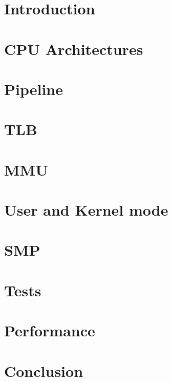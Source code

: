 \documentclass[11pt, twocolumn]{article}
\begin{document}
		\onecolumn
		\newpage
		\twocolumn

		\clearpage
		\setcounter{page}{1}

		\noindent


			\section{Introduction}
			



			\section{CPU Architectures}
			


			\section{Pipeline}
			


			\section{TLB}

			\section{MMU}

			\section{User and Kernel mode}

			\section{SMP}

			\section{Tests}

			\section{Performance}

			\section{Conclusion}


			\newpage

			{}
			

			\newpage

			\appendix
			\begin{appendices}
			\end{appendices}

			
\end{document}
